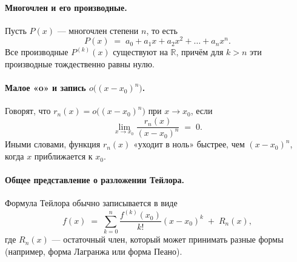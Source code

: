 
\paragraph{Многочлен и его производные.}
Пусть $P(x)$ — многочлен степени $n$, то есть
\[
	P(x) \;=\; a_0 + a_1 x + a_2 x^2 + \dots + a_n x^n.
\]
Все производные $P^{(k)}(x)$ существуют на $\mathbb{R}$, причём для $k>n$ эти производные тождественно равны нулю.

\bigskip

\paragraph{Малое «o» и запись $o\bigl((x-x_0)^n\bigr)$.}
Говорят, что $r_n(x) = o\bigl((x - x_0)^n\bigr)$ при $x \to x_0$,
если
\[
	\lim_{x\to x_0}
	\frac{r_n(x)}{(x - x_0)^n}
	\;=\; 0.
\]
Иными словами, функция $r_n(x)$ «уходит в ноль» быстрее, чем $(x - x_0)^n$, когда $x$ приближается к $x_0$.

\bigskip

\paragraph{Общее представление о разложении Тейлора.}
Формула Тейлора обычно записывается в виде
\[
	f(x) \;=\;
	\sum_{k=0}^n \frac{f^{(k)}(x_0)}{k!}(x - x_0)^k \;+\; R_n(x),
\]
где $R_n(x)$ — остаточный член, который может принимать разные формы (например, форма Лагранжа или форма Пеано).

